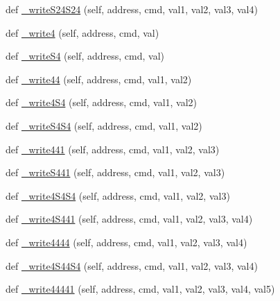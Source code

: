 \begin{DoxyCompactItemize}
\item 
def \mbox{\hyperlink{classtoxic__hardware_1_1roboclaw__3_1_1Roboclaw_ab9a1f183de43e1f3bc9e6193a3a507b6}{\+\_\+write\+S24\+S24}} (self, address, cmd, val1, val2, val3, val4)
\item 
def \mbox{\hyperlink{classtoxic__hardware_1_1roboclaw__3_1_1Roboclaw_ab234c49f09cd0b5634795fcf665336ac}{\+\_\+write4}} (self, address, cmd, val)
\item 
def \mbox{\hyperlink{classtoxic__hardware_1_1roboclaw__3_1_1Roboclaw_a34b9b9300afab1efbbc42d181c56d4b7}{\+\_\+write\+S4}} (self, address, cmd, val)
\item 
def \mbox{\hyperlink{classtoxic__hardware_1_1roboclaw__3_1_1Roboclaw_a9c08af5c10d3a64f8fe7fc9ad06b0264}{\+\_\+write44}} (self, address, cmd, val1, val2)
\item 
def \mbox{\hyperlink{classtoxic__hardware_1_1roboclaw__3_1_1Roboclaw_a605ee94779f3b9b2b6a940f418379c19}{\+\_\+write4\+S4}} (self, address, cmd, val1, val2)
\item 
def \mbox{\hyperlink{classtoxic__hardware_1_1roboclaw__3_1_1Roboclaw_a68c18336b966db584c4af7ca9a7270c5}{\+\_\+write\+S4\+S4}} (self, address, cmd, val1, val2)
\item 
def \mbox{\hyperlink{classtoxic__hardware_1_1roboclaw__3_1_1Roboclaw_a27bbed81507d1f977f95c828e84e807d}{\+\_\+write441}} (self, address, cmd, val1, val2, val3)
\item 
def \mbox{\hyperlink{classtoxic__hardware_1_1roboclaw__3_1_1Roboclaw_ad31595fb54ad1158569552405f74a6cf}{\+\_\+write\+S441}} (self, address, cmd, val1, val2, val3)
\item 
def \mbox{\hyperlink{classtoxic__hardware_1_1roboclaw__3_1_1Roboclaw_a3cd6f858935eaf1dcb0563bd81e97cc0}{\+\_\+write4\+S4\+S4}} (self, address, cmd, val1, val2, val3)
\item 
def \mbox{\hyperlink{classtoxic__hardware_1_1roboclaw__3_1_1Roboclaw_ac5229f360d098694a67971eab10d5e66}{\+\_\+write4\+S441}} (self, address, cmd, val1, val2, val3, val4)
\item 
def \mbox{\hyperlink{classtoxic__hardware_1_1roboclaw__3_1_1Roboclaw_a24d6c8ebb8ad82ebb15ca810cd9fdb07}{\+\_\+write4444}} (self, address, cmd, val1, val2, val3, val4)
\item 
def \mbox{\hyperlink{classtoxic__hardware_1_1roboclaw__3_1_1Roboclaw_afc692daccdef6d41332b2c9f4063cad5}{\+\_\+write4\+S44\+S4}} (self, address, cmd, val1, val2, val3, val4)
\item 
def \mbox{\hyperlink{classtoxic__hardware_1_1roboclaw__3_1_1Roboclaw_a3276351c3285e97da9390e30d85ea855}{\+\_\+write44441}} (self, address, cmd, val1, val2, val3, val4, val5)

\end{DoxyCompactItemize}
